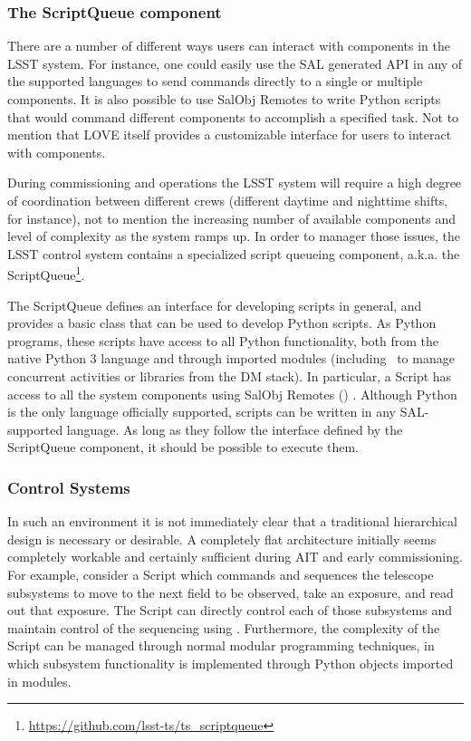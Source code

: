 \subsubsection{The ScriptQueue component} \label{sect:scriptq}
There are a number of different ways users can interact with components in the LSST system. For instance, one could easily use the SAL generated API in any of the supported languages to send commands directly to a single or multiple components. It is also possible to use SalObj Remotes to write Python scripts that would command different components to accomplish a specified task. Not to mention that LOVE itself provides a customizable interface for users to interact with components. 

During commissioning and operations the LSST system will require a high degree of coordination between different crews (different daytime and nighttime shifts, for instance), not to mention the increasing number of available components and level of complexity as the system ramps up. In order to manager those issues, the LSST control system contains a specialized script queueing component, a.k.a. the ScriptQueue\footnote{\url{https://github.com/lsst-ts/ts_scriptqueue}}.

The ScriptQueue defines an interface for developing scripts in general, and provides a basic class that can be used to develop Python scripts. As Python programs, these scripts have access to all Python functionality, both from the native Python 3 language and through imported modules (including \asyncio~to manage concurrent activities or libraries from the DM stack). In particular, a Script has access to all the system components using SalObj Remotes () . Although Python is the only language officially supported, scripts can be written in any SAL-supported language. As long as they follow the interface defined by the ScriptQueue component, it should be possible to execute them. 

\subsubsection{Control Systems} \label{sect:ocs}
In such an environment it is not immediately clear that a traditional hierarchical design is necessary or desirable. A completely flat architecture initially seems completely workable and certainly sufficient during AIT and early commissioning. For example, consider a Script which commands and sequences the telescope subsystems to move to the next field to be observed, take an exposure, and read out that exposure. The Script can directly control each of those subsystems and maintain control of the sequencing using \asyncio. Furthermore, the complexity of the Script can be managed through normal modular programming techniques, in which subsystem functionality is implemented through Python objects imported in modules.

